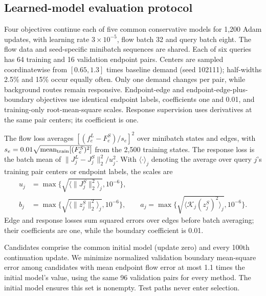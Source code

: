 \subsection{Learned-model evaluation protocol}\label{app:pairs-v102}
Four objectives continue each of five common conservative models for 1,200 Adam
updates, with learning rate $3\times10^{-5}$, flow batch 32 and query batch eight.
The flow data and seed-specific minibatch sequences are shared. Each of six
queries has 64 training and 16 validation endpoint pairs. Centers are sampled
coordinatewise from $[0.65,1.3]$ times baseline demand (seed 102111);
half-widths 2.5\% and 15\% occur equally often. Only one demand changes per
pair, while background routes remain responsive. Endpoint-edge and
endpoint-edge-plus-boundary objectives use identical endpoint labels, coefficients
one and 0.01, and training-only root-mean-square scales. Response supervision
uses derivatives at the same pair centers; its coefficient is one.

The flow loss averages $[(f_e^L-F_e^S)/s_e]^2$ over minibatch states and edges, with $s_e=0.01\sqrt{\operatorname{mean}_{\rm train}[(F_e^S)^2]}$ from the 2,500 training states. The response loss is the batch mean of $\|J_j^L-J_j^S\|_2^2/u_j^2$. With $\langle\cdot\rangle_j$ denoting the average over query $j$'s training pair centers or endpoint labels, the scales are
\[
\begin{aligned}
u_j&=\max\{\sqrt{\langle\|J_j^S\|_2^2\rangle_j},10^{-6}\},\\
b_j&=\max\{\sqrt{\langle\|z_j^S\|_2^2\rangle_j},10^{-6}\},\qquad
a_j=\max\{\sqrt{\langle\mathcal K_j(z_j^S)^2\rangle_j},10^{-6}\}.
\end{aligned}
\]
Edge and response losses sum squared errors over edges before batch averaging; their coefficients are one, while the boundary coefficient is 0.01.

Candidates comprise the common initial model (update zero) and every 100th
continuation update. We minimize normalized validation boundary mean-square
error among candidates with mean endpoint flow error at most 1.1 times the
initial model's value, using the same 96 validation pairs for every method.
The initial model ensures this set is nonempty. Test paths never enter selection.

